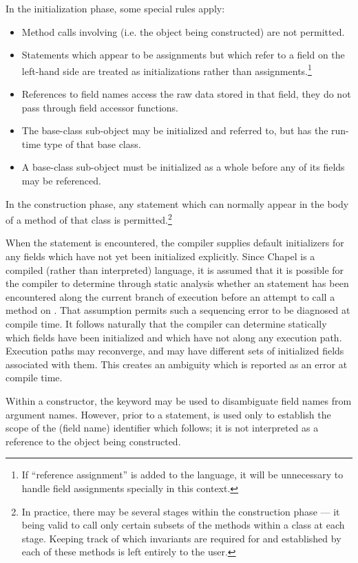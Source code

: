 In the initialization phase, some special rules apply:
\begin{itemize}
\item Method calls involving  (i.e. the object being constructed) are not permitted.  
\item Statements which appear to be assignments but which refer to a field on
the left-hand side are treated as initializations rather than
assignments.\footnote{If ``reference assignment'' is added to the language, it
will be unnecessary to handle field assignments specially in this context.}
\item References to field names access the raw data stored in that field, they
do not pass through field accessor functions.
\item The base-class sub-object may be initialized and referred to, but has the
run-time type of that base class.
\item A base-class sub-object must be initialized as a whole before any of its
fields may be referenced.
\end{itemize}
\noindent
In the construction phase, any statement which can normally appear in the body
of a method of that class is permitted.\footnote{In practice, there may be
several stages within the construction phase --- it being valid to call only
certain subsets of the methods within a class at each stage.  Keeping track of
which invariants are required for and established by each of these methods is
left entirely to the user.}

When the  statement is encountered, the compiler supplies default
initializers for any fields which have not yet been initialized
explicitly.  
Since Chapel is a compiled (rather than interpreted) language, it is
assumed that it is possible for the compiler to determine through static
analysis whether an  statement has been encountered along the current
branch of execution before an attempt to call a method on .  That
assumption permits such a sequencing error to be diagnosed at compile time.  It
follows naturally that the compiler can determine statically which fields have
been initialized and which have not along any execution path.  Execution paths
may reconverge, and may have different sets of initialized fields associated
with them.  This creates an ambiguity which is reported as an error
at compile time.

Within a constructor, the  keyword may be used to disambiguate field
names from argument names.  However, prior to a  statement, 
 is used only to establish the scope of the (field name) identifier
which follows; it is not interpreted as a reference to the object being constructed.

